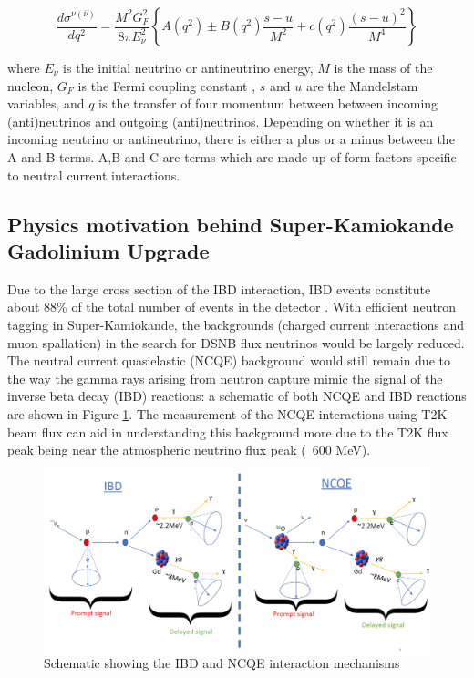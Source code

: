 \begin{equation}
\frac{d \sigma^{\nu(\bar{\nu})}}{d q^{2}}=\frac{M^{2} G_{F}^{2}}{8 \pi E_{\nu}^{2}}\left\{A\left(q^{2}\right) \pm B\left(q^{2}\right) \frac{s-u}{M^{2}}+c\left(q^{2}\right) \frac{(s-u)^{2}}{M^{4}}\right\}
\label{eq:NCQExsec}
\end{equation}
    
where $E_{\nu}$ is the initial neutrino or antineutrino energy, $M$ is the mass of the nucleon, $G_{F}$ is the Fermi coupling constant \cite{van2000precise}, $s$ and $u$ are the Mandelstam variables, and $q$ is the transfer of four momentum between between incoming (anti)neutrinos and outgoing (anti)neutrinos. Depending on whether it is an incoming neutrino or antineutrino, there is either a plus or a minus between the A and B terms. A,B and C are terms which are made up of form factors specific to neutral current interactions.


\subsection{Physics motivation behind Super-Kamiokande Gadolinium Upgrade}

Due to the large cross section of the IBD interaction, IBD events constitute about 88\% of the total number of events in the detector \cite{marti_evaluation_2020}. With efficient neutron tagging in Super-Kamiokande, the backgrounds (charged current interactions and muon spallation) in the search for DSNB flux neutrinos would be largely reduced. The neutral current quasielastic (NCQE) background would still remain due to the way the gamma rays arising from neutron capture mimic the signal of the inverse beta decay (IBD) reactions: a schematic of both NCQE and IBD reactions are shown in Figure \ref{fig:NCQE_IBD}. The measurement of the NCQE interactions using T2K beam flux can aid in understanding this background more due to the T2K flux peak being near the atmospheric neutrino flux peak (~600 MeV). 


\begin{figure}
    \centering
    \includegraphics[width=\textwidth]{Figures/schematic.png}
\caption{Schematic showing the IBD and NCQE interaction mechanisms}
\label{fig:NCQE_IBD}
\end{figure}


